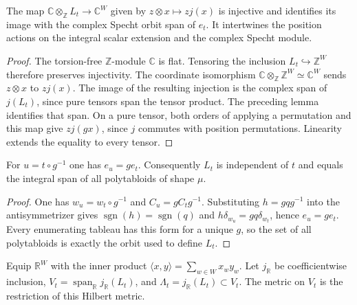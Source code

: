 \begin{lemma}
\label{lem:integral-specht-base-change}
\leanok
The map $\mathbb C\otimes_\mathbb Z L_t\to\mathbb C^W$ given by
$z\otimes x\mapsto zj(x)$ is injective and identifies its image with
the complex Specht orbit span of $e_t$. It intertwines the position
actions on the integral scalar extension and the complex Specht module.
\end{lemma}
\begin{proof}
The torsion-free $\mathbb Z$-module $\mathbb C$ is flat. Tensoring the
inclusion $L_t\hookrightarrow\mathbb Z^W$ therefore preserves injectivity.
The coordinate isomorphism
$\mathbb C\otimes_\mathbb Z\mathbb Z^W\simeq\mathbb C^W$ sends
$z\otimes x$ to $zj(x)$. The image of the resulting injection is the
complex span of $j(L_t)$, since pure tensors span the tensor product.
The preceding lemma identifies that span. On a pure tensor, both orders
of applying a permutation and this map give $zj(gx)$, since $j$ commutes
with position permutations. Linearity extends the equality to every tensor.
\end{proof}

\begin{lemma}
\label{lem:integral-specht-all-tableaux}
\leanok
For $u=t\circ g^{-1}$ one has $e_u=g e_t$. Consequently $L_t$ is
independent of $t$ and equals the integral span of all polytabloids
of shape $\mu$.
\end{lemma}
\begin{proof}
One has $w_u=w_t\circ g^{-1}$ and $C_u=g C_t g^{-1}$.
Substituting $h=g q g^{-1}$ into the antisymmetrizer gives
$\operatorname{sgn}(h)=\operatorname{sgn}(q)$ and
$h\delta_{w_u}=gq\delta_{w_t}$, hence $e_u=g e_t$.
Every enumerating tableau has this form for a unique $g$, so the set
of all polytabloids is exactly the orbit used to define $L_t$.
\end{proof}

\begin{definition}
\label{def:real-specht-lattice}
\leanok
Equip $\mathbb R^W$ with the inner product
$\langle x,y\rangle=\sum_{w\in W}x_w y_w$. Let $j_\mathbb R$
be coefficientwise inclusion, $V_t=\operatorname{span}_\mathbb R
j_\mathbb R(L_t)$, and $\Lambda_t=j_\mathbb R(L_t)\subset V_t$.
The metric on $V_t$ is the restriction of this Hilbert metric.
\end{definition}

